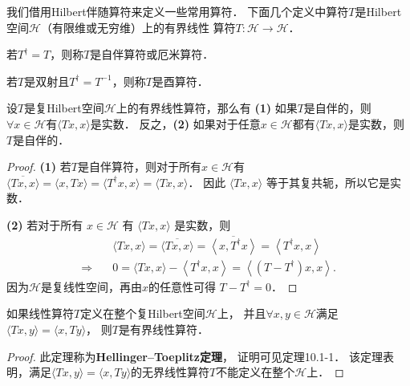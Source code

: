 我们借用Hilbert伴随算符来定义一些常用算符．
下面几个定义中算符$T$是Hilbert空间$\mathcal{H}$（有限维或无穷维）上的有界线性
算符$T: \mathcal{H} \longrightarrow \mathcal{H}$．

\begin{definition}
	若$T^{\dagger}=T$，则称$T$是{\heiti 自伴算符}或{\heiti 厄米算符}．
\end{definition}

\begin{definition}
	若$T$是双射且$T^{\dagger}=T^{-1}$，则称$T$是{\heiti 酉算符}．
\end{definition}


\begin{theorem}
	设$T$是复Hilbert空间$\mathcal{H}$上的有界线性算符，那么有
	{\bfseries (1)} 如果$T$是自伴的，则$\forall x \in \mathcal{H}$有$\langle T x, x\rangle$是实数．
	反之，{\bfseries (2)} 如果对于任意$x \in \mathcal{H}$都有$\langle T x, x\rangle$是实数，则$T$是自伴的．
\end{theorem}
\begin{proof}
{\bfseries (1)} 若$T$是自伴算符，则对于所有$x \in \mathcal{H}$有
$\overline{\langle T x, x\rangle}=\langle x, T x\rangle
=\langle T^\dagger x, x\rangle =\langle T x, x\rangle$．
因此 $\langle T x, x\rangle$ 等于其复共轭，所以它是实数．


{\bfseries (2)} 若对于所有 $x \in \mathcal{H}$ 有 $\langle T x, x\rangle$ 是实数，则
\begin{align*}
 &\langle T x, x\rangle=\overline{\langle T x, x\rangle}
=\overline{\left\langle x, T^{\dagger} x\right\rangle}
=\left\langle T^{\dagger} x, x\right\rangle \\
\Rightarrow\quad & 0
=\langle T x, x\rangle-\left\langle T^{\dagger} x, x\right\rangle
=\left\langle\left(T-T^{\dagger}\right) x, x\right\rangle .
\end{align*}
因为$\mathcal{H}$是复线性空间，再由$x$的任意性可得 $T-T^{\dagger}=0$．
\end{proof}


\begin{theorem}\label{chhs:thm_HT}
	如果线性算符$T$定义在整个复Hilbert空间$\mathcal{H}$上，
	并且$\forall x, y \in \mathcal{H}$满足$\langle T x, y\rangle=\langle x, T y\rangle$，
	则$T$是有界线性算符．
\end{theorem}

\begin{proof}
	此定理称为{\bfseries \heiti Hellinger--Toeplitz定理}，
	证明可见\parencite{Kreyszig-1991}定理10.1-1．
	该定理表明，满足$\langle T x, y\rangle=\langle x, T y\rangle$的无界线性算符$T$不能定义在整个$\mathcal{H}$上．	
\end{proof}


